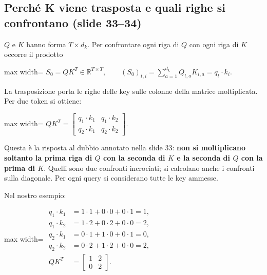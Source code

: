 \documentclass[11pt,a4paper,oneside,openany]{book}
\begin{document}
\subsection{Perché K viene trasposta e quali righe si confrontano (slide 33--34)}\label{f04-r606}

\(Q\) e \(K\) hanno forma \(T\times d_k\). Per confrontare ogni riga di \(Q\) con ogni riga di \(K\) occorre il prodotto

\begin{center}
\begin{adjustbox}{max width=\linewidth}
$\displaystyle \boxed{S_0=QK^T\in\mathbb R^{T\times T},\qquad (S_0)_{t,i}=\sum_{a=1}^{d_k}Q_{t,a}K_{i,a}=q_t\cdot k_i.}$
\end{adjustbox}
\end{center}

La trasposizione porta le righe delle key sulle colonne della matrice moltiplicata. Per due token si ottiene:

\begin{center}
\begin{adjustbox}{max width=\linewidth}
$\displaystyle QK^T=\begin{bmatrix}
q_1\cdot k_1&q_1\cdot k_2\\
q_2\cdot k_1&q_2\cdot k_2
\end{bmatrix}.$
\end{adjustbox}
\end{center}

Questa è la risposta al dubbio annotato nella slide 33: \textbf{non si moltiplicano soltanto la prima riga di \(Q\) con la seconda di \(K\) e la seconda di \(Q\) con la prima di \(K\)}. Quelli sono due confronti incrociati; si calcolano anche i confronti sulla diagonale. Per ogni query si considerano tutte le key ammesse.

Nel nostro esempio:

\begin{center}
\begin{adjustbox}{max width=\linewidth}
$\displaystyle 
\begin{aligned}
q_1\cdot k_1&=1\cdot1+0\cdot0+0\cdot1=1,\\
q_1\cdot k_2&=1\cdot2+0\cdot2+0\cdot0=2,\\
q_2\cdot k_1&=0\cdot1+1\cdot0+0\cdot1=0,\\
q_2\cdot k_2&=0\cdot2+1\cdot2+0\cdot0=2,\\
QK^T&=\begin{bmatrix}1&2\\0&2\end{bmatrix}.
\end{aligned}
$
\end{adjustbox}
\end{center}
\end{document}
